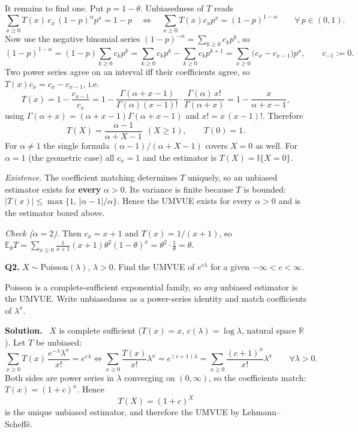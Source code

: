 \documentclass[11pt]{article}
\newcommand{\E}{\mathbb{E}}
\newcommand{\R}{\mathbb{R}}
\newenvironment{prob}[1]{\medskip\noindent\textbf{\large #1}\quad}{\par}
\newcommand{\soln}{\medskip\noindent\textbf{Solution.}\ }
\begin{document}
It remains to find one. Put $p=1-\theta$. Unbiasedness of $T$ reads
\[
\sum_{x\ge0}T(x)\,c_x\,(1-p)^{\alpha}p^{x}=1-p
\quad\Longleftrightarrow\quad
\sum_{x\ge0}T(x)c_x p^x=(1-p)^{1-\alpha}
\qquad \forall\,p\in(0,1).
\]
Now use the negative binomial series $\displaystyle(1-p)^{-\alpha}=\sum_{k\ge0}c_kp^k$, so
\[
(1-p)^{1-\alpha}=(1-p)\sum_{k\ge0}c_kp^k=\sum_{k\ge0}c_kp^k-\sum_{k\ge0}c_kp^{k+1}
=\sum_{x\ge0}\big(c_x-c_{x-1}\big)p^x,\qquad c_{-1}:=0 .
\]
Two power series agree on an interval iff their coefficients agree, so
$T(x)c_x=c_x-c_{x-1}$, i.e.
\[
T(x)=1-\frac{c_{x-1}}{c_x}
=1-\frac{\Gamma(\alpha+x-1)}{\Gamma(\alpha)(x-1)!}\cdot\frac{\Gamma(\alpha)\,x!}{\Gamma(\alpha+x)}
=1-\frac{x}{\alpha+x-1},
\]
using $\Gamma(\alpha+x)=(\alpha+x-1)\Gamma(\alpha+x-1)$ and $x!=x\,(x-1)!$. Therefore
\[
\boxed{\ T(X)=\frac{\alpha-1}{\alpha+X-1}\ \ (X\ge1),\qquad T(0)=1.\ }
\]
For $\alpha\ne1$ the single formula $(\alpha-1)/(\alpha+X-1)$ covers $X=0$ as well. For
$\alpha=1$ (the geometric case) all $c_x=1$ and the estimator is $T(X)=\mathbb{I}\{X=0\}$.

\emph{Existence.} The coefficient matching determines $T$ uniquely, so an unbiased estimator
exists for \textbf{every} $\alpha>0$. Its variance is finite because $T$ is bounded:
$|T(x)|\le\max\{1,\,|\alpha-1|/\alpha\}$. Hence the UMVUE exists for every $\alpha>0$ and is
the estimator boxed above.

\emph{Check ($\alpha=2$).} Then $c_x=x+1$ and $T(x)=1/(x+1)$, so
$\E_\theta T=\sum_{x\ge0}\frac{1}{x+1}(x+1)\theta^2(1-\theta)^x=\theta^2\cdot\frac{1}{\theta}=\theta$. \checkmark

\bigskip
\begin{prob}{Q2.}
$X\sim\mathrm{Poisson}(\lambda)$, $\lambda>0$. Find the UMVUE of $e^{c\lambda}$ for a given
$-\infty<c<\infty$.
\end{prob}

\begin{ideabox}
Poisson is a complete-sufficient exponential family, so \emph{any} unbiased estimator is the
UMVUE. Write unbiasedness as a power-series identity and match coefficients of $\lambda^x$.
\end{ideabox}

\soln
$X$ is complete sufficient ($T(x)=x$, $c(\lambda)=\log\lambda$, natural space $\R$). Let $T$
be unbiased:
\[
\sum_{x\ge0}T(x)\,\frac{e^{-\lambda}\lambda^{x}}{x!}=e^{c\lambda}
\iff
\sum_{x\ge0}\frac{T(x)}{x!}\lambda^{x}=e^{(c+1)\lambda}
=\sum_{x\ge0}\frac{(c+1)^{x}}{x!}\lambda^{x}\qquad\forall\lambda>0.
\]
Both sides are power series in $\lambda$ converging on $(0,\infty)$, so the coefficients match:
$T(x)=(1+c)^{x}$. Hence
\[
\boxed{\ T(X)=(1+c)^{X}\ }
\]
is the unique unbiased estimator, and therefore the UMVUE by Lehmann--Scheff\'e.
\end{document}
